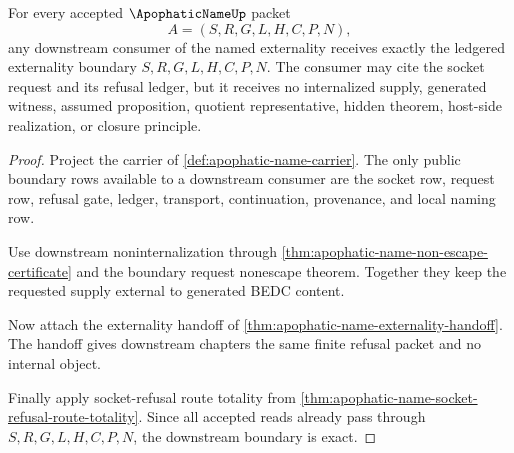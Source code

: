 \begin{theorem}
\label{thm:apophatic-name-downstream-boundary-exactness}
For every accepted $\ApophaticNameUp$ packet
$$
A=(S,R,G,L,H,C,P,N),
$$
any downstream consumer of the named externality receives exactly the ledgered externality boundary $S,R,G,L,H,C,P,N$. The consumer may cite the socket request and its refusal ledger, but it receives no internalized supply, generated witness, assumed proposition, quotient representative, hidden theorem, host-side realization, or closure principle.
\end{theorem}
\begin{proof}
Project the carrier of \autoref{def:apophatic-name-carrier}. The only public boundary rows available to a downstream consumer are the socket row, request row, refusal gate, ledger, transport, continuation, provenance, and local naming row.

Use downstream noninternalization through \autoref{thm:apophatic-name-non-escape-certificate} and the boundary request nonescape theorem. Together they keep the requested supply external to generated BEDC content.

Now attach the externality handoff of \autoref{thm:apophatic-name-externality-handoff}. The handoff gives downstream chapters the same finite refusal packet and no internal object.

Finally apply socket-refusal route totality from \autoref{thm:apophatic-name-socket-refusal-route-totality}. Since all accepted reads already pass through $S,R,G,L,H,C,P,N$, the downstream boundary is exact.
\end{proof}

